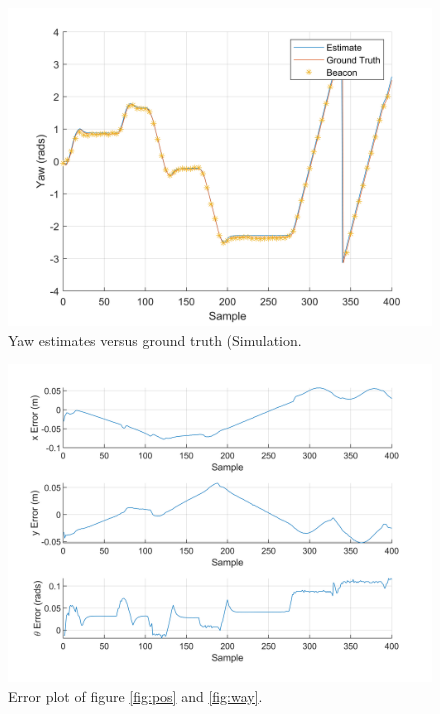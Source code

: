 	\begin{figure}
	    	\captionsetup{width=\columnwidth}
	   	\centering
	   	\includegraphics[width=\columnwidth]{./graphics/yawSimu.png}
	   	\caption{Yaw estimates versus ground truth (Simulation.}
		\label{fig:yaw}
	\end{figure}
	
	\begin{figure}
	    	\captionsetup{width=\columnwidth}
	   	\centering
	   	\includegraphics[width=\columnwidth]{./graphics/Error.png}
	   	\caption{Error plot of figure \ref{fig:pos} and \ref{fig:way}.}
		\label{fig:err2}
	\end{figure}